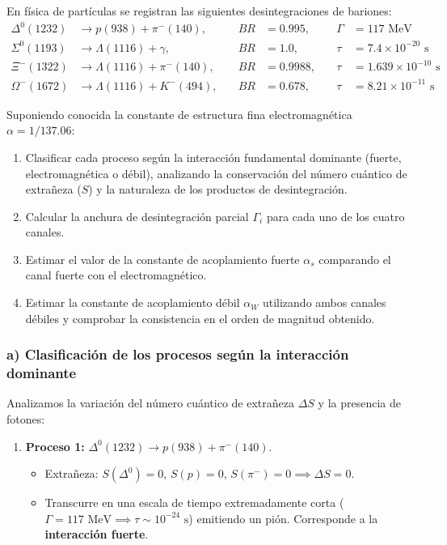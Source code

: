 \newpage
\begin{problema}
En física de partículas se registran las siguientes desintegraciones de bariones:
\begin{align*}
    \Delta^0(1232) &\to p(938) + \pi^-(140), \quad &BR &= 0.995, \quad &\Gamma &= 117 \text{ MeV} \\
    \Sigma^0(1193) &\to \Lambda(1116) + \gamma, \quad &BR &= 1.0, \quad &\tau &= 7.4 \times 10^{-20} \text{ s} \\
    \Xi^-(1322) &\to \Lambda(1116) + \pi^-(140), \quad &BR &= 0.9988, \quad &\tau &= 1.639 \times 10^{-10} \text{ s} \\
    \Omega^-(1672) &\to \Lambda(1116) + K^-(494), \quad &BR &= 0.678, \quad &\tau &= 8.21 \times 10^{-11} \text{ s}
\end{align*}

Suponiendo conocida la constante de estructura fina electromagnética $\alpha = 1/137.06$:
\begin{enumerate}[label=\alph*)]
    \item Clasificar cada proceso según la interacción fundamental dominante (fuerte, electromagnética o débil), analizando la conservación del número cuántico de extrañeza ($S$) y la naturaleza de los productos de desintegración.
    \item Calcular la anchura de desintegración parcial $\Gamma_i$ para cada uno de los cuatro canales.
    \item Estimar el valor de la constante de acoplamiento fuerte $\alpha_s$ comparando el canal fuerte con el electromagnético.
    \item Estimar la constante de acoplamiento débil $\alpha_W$ utilizando ambos canales débiles y comprobar la consistencia en el orden de magnitud obtenido.
\end{enumerate}

\tcblower

\subsubsection*{a) Clasificación de los procesos según la interacción dominante}

Analizamos la variación del número cuántico de extrañeza $\Delta S$ y la presencia de fotones:
\begin{enumerate}[label=\arabic*.]
    \item \textbf{Proceso 1:} $\Delta^0(1232) \to p(938) + \pi^-(140)$.
    \begin{itemize}
        \item Extrañeza: $S(\Delta^0) = 0$, $S(p) = 0$, $S(\pi^-) = 0 \implies \Delta S = 0$.
        \item Transcurre en una escala de tiempo extremadamente corta ($\Gamma = 117\text{ MeV} \implies \tau \sim 10^{-24}\text{ s}$) emitiendo un pión. Corresponde a la \textbf{interacción fuerte}.
    \end{itemize}


\end{enumerate}
\end{problema}
